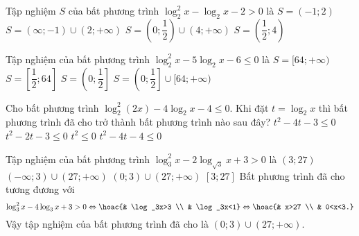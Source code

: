 \begin{ex}%
	Tập nghiệm $ S $ của bất phương trình $ \log_2^2 x - \log_2 x-2>0 $ là
	\choice
	{$ S=(-1;2)$}
	{$ S=(\infty;-1)\cup (2;+\infty)$}
	{\True $ S=\left(0;\dfrac{1}{2}\right) \cup (4;+\infty)$}
	{$ S=\left(\dfrac{1}{2};4\right)$}
\end{ex}


\begin{ex}%
	Tập nghiệm của bất phương trình $\log_2^2x-5\log_2x-6\leq 0$ là
	\choice
	{$S=[64;+\infty)$}
	{\True $S=\left[\dfrac{1}{2};64\right]$}
	{$S=\left(0;\dfrac{1}{2}\right]$}
	{$S=\left(0;\dfrac{1}{2}\right]\cup[64;+\infty)$}
\end{ex}

\begin{ex}%
	Cho bất phương trình $\log_2^2 (2x) - 4\log_2 x - 4 \leq 0$. Khi đặt $t = \log_2 x$ thì bất phương trình đã cho trở thành bất phương trình nào sau đây?
	\choice
	{$ t^2 - 4t - 3 \leq 0$}
	{\True $ t^2 - 2t - 3 \leq 0 $}
	{$ t^2 \leq 0 $}
	{ $t^2 - 4t - 4 \leq 0$ }
\end{ex}


\begin{ex}%
	Tập nghiệm của bất phương trình $\log_3^2x-2\log_{\sqrt{3}}x+3>0$ là
	\choice
	{$(3;27)$}
	{$(-\infty;3)\cup(27;+\infty)$}
	{\True $(0;3)\cup(27;+\infty)$}
	{$[3;27]$}
	\loigiai
	{
		Bất phương trình đã cho tương đương với
		\[\log_3^2x-4\log_{3}x+3>0\Leftrightarrow\hoac{& \log_3x>3 \\ & \log_3x<1}\Leftrightarrow\hoac{& x>27 \\ & 0<x<3.}\]
		Vậy tập nghiệm của bất phương trình đã cho là $(0;3)\cup(27;+\infty)$.
	}
\end{ex}

